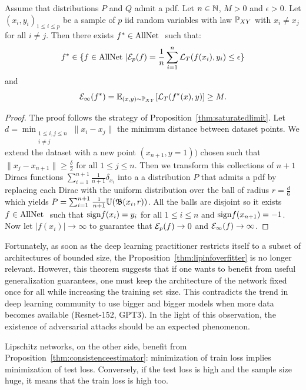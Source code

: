         \begin{proposition}\label{thm:lipinfoverfitter}%
            Assume that distributions $P$ and $Q$ admit a pdf. Let $n\in\mathbb{N}$, $M>0$ and $\epsilon>0$.  Let $(x_i,y_i)_{1\leq i\leq p}$ be a sample of $p$ iid random variables with law $\mathbb{P}_{XY}$ with $x_i\neq x_j$ for all $i\neq j$. Then there exists $f^{*}\in\text{AllNet }$ such that:
            $$f^{*}\in\{f\in\text{AllNet }|\mathcal{E}_p(f)=\frac{1}{n}\sum_{i=1}^n\mathcal{L}_T(f(x_i),y_i)\leq\epsilon\}$$
            and
            $$\mathcal{E}_{\infty}(f^{*})=\mathbb{E}_{(x,y)\sim \mathbb{P}_{XY}}[\mathcal{L}_T(f^{*}(x),y)]\geq M.$$
        \end{proposition}
        \begin{proof}
            The proof follows the strategy of Proposition~\ref{thm:saturatedlimit}. Let $d=\min_{\substack{1\leq i,j\leq n\\ i\neq j}}\|x_i-x_j\|$ the minimum distance between dataset points. We extend the dataset with a new point $(x_{n+1},y=1))$ chosen such that $\|x_j-x_{n+1}\|\geq \frac{\delta}{2}$ for all $1\leq j\leq n$. Then we transform this collections of $n+1$ Diracs functions $\sum_{i=1}^{n+1} \frac{1}{n+1}\delta_{x_i}$ into a a distribution $P$ that admits a pdf by replacing each Dirac with the uniform distribution over the ball of radius $r=\frac{d}{6}$ which yields $P=\sum_{i=1}^{n+1} \frac{1}{n+1}\mathbb{U}(\mathfrak{B}(x_i,r))$. All the balls are disjoint so it exists $f\in\text{AllNet }$ such that $\text{sign}{f(x_i)}=y_i$ for all $1\leq i\leq n$ and $\text{sign}{f(x_{n+1})}=-1$. Now let $|f(x_i)|\rightarrow\infty$ to guarantee that $\mathcal{E}_p(f)\rightarrow 0$ and $\mathcal{E}_{\infty}(f)\rightarrow\infty$. 
        \end{proof}
        
        Fortunately, as soon as the deep learning practitioner restricts itself to a subset of architectures of bounded size, the Proposition~\ref{thm:lipinfoverfitter} is no longer relevant. However, this theorem suggests that if one wants to benefit from useful generalization guarantees, one must keep the architecture of the network fixed once for all while increasing the training set size. This contradicts the trend in deep learning community to use bigger and bigger models when more data becomes available (Resnet-152, GPT3). In the light of this observation, the existence of adversarial attacks should be an expected phenomenon.  
          
        Lipschitz networks, on the other side, benefit from Proposition~\ref{thm:consistenceestimator}: minimization of train loss implies minimization of test loss. Conversely, if the test loss is high and the sample size huge, it means that the train loss is high too.

